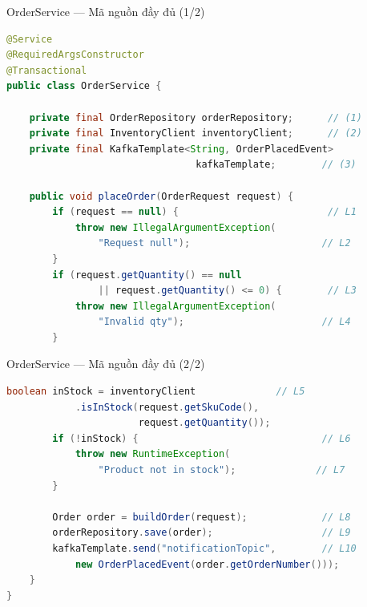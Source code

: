 \documentclass[aspectratio=169,10pt]{beamer}
\begin{document}
\begin{frame}[fragile]{OrderService --- Mã nguồn đầy đủ (1/2)}
\begin{lstlisting}[language=java]
@Service
@RequiredArgsConstructor
@Transactional
public class OrderService {

    private final OrderRepository orderRepository;      // (1)
    private final InventoryClient inventoryClient;      // (2)
    private final KafkaTemplate<String, OrderPlacedEvent>
                                 kafkaTemplate;        // (3)

    public void placeOrder(OrderRequest request) {
        if (request == null) {                          // L1
            throw new IllegalArgumentException(
                "Request null");                       // L2
        }
        if (request.getQuantity() == null
                || request.getQuantity() <= 0) {        // L3
            throw new IllegalArgumentException(
                "Invalid qty");                        // L4
        }
\end{lstlisting}
\end{frame}

\begin{frame}[fragile]{OrderService --- Mã nguồn đầy đủ (2/2)}
\begin{lstlisting}[language=java]
        boolean inStock = inventoryClient              // L5
            .isInStock(request.getSkuCode(),
                       request.getQuantity());
        if (!inStock) {                                // L6
            throw new RuntimeException(
                "Product not in stock");              // L7
        }

        Order order = buildOrder(request);             // L8
        orderRepository.save(order);                   // L9
        kafkaTemplate.send("notificationTopic",        // L10
            new OrderPlacedEvent(order.getOrderNumber()));
    }
}
\end{lstlisting}
\end{frame}
\end{document}
